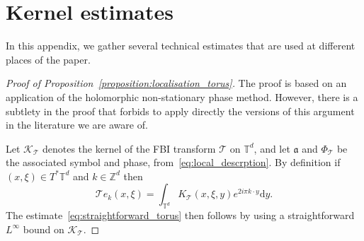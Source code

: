 \documentclass[10pt]{amsart}
\theoremstyle{definition}\newtheorem{defi}[theo]{Definition}\newtheorem{rema}[theo]{Remark}\newtheorem{exam}[theo]{Example}\newtheorem{exem}[theo]{Example}\newtheorem{nota}[theo]{Notation}
\newcommand{\clT}{\mathcal{T}}
\newcommand{\clK}{\mathcal{K}}
\newcommand{\fka}{\mathfrak{a}}
\newcommand{\bbZ}{\mathbb{Z}}
\newcommand{\bbT}{\mathbb{T}}
\newcommand{\rmd}{\mathrm{d}}
\begin{document}
\appendix

\section{Kernel estimates}\label{appendix:kernel_estimates}

In this appendix, we gather several technical estimates that are used at different places of the paper.

\begin{proof}[Proof of Proposition~\ref{proposition:localisation_torus}]
The proof is based on an application of the holomorphic non-stationary phase method. However, there is a subtlety in the proof that forbids to apply directly the versions of this argument in the literature we are aware of.

Let $\clK _{\clT}$ denotes the kernel of the FBI transform $\clT$ on $\bbT^d$, and let $\fka$ and $\Phi_{\clT}$ be the associated symbol and phase, from~\eqref{eq:local_descrption}. By definition if $(x,\xi) \in T^* \bbT^d$ and $k \in \bbZ^d$ then
\begin{equation}\label{eq:explicit_transform_torus}
\clT e_k (x,\xi) = \int_{\bbT^d} K_{\clT}(x,\xi,y) e^{2 i \pi k \cdot y} \rmd y.
\end{equation}
The estimate~\eqref{eq:straightforward_torus} then follows by using a straightforward $L^\infty$ bound on $\clK _{\clT}$.


\end{proof}
\end{document}
